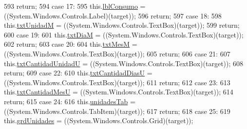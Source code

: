 \begin{DoxyCode}
593             \textcolor{keywordflow}{return};
594             \textcolor{keywordflow}{case} 17:
595             this.\hyperlink{class_proyecto___integrador__3_1_1_reportes_1_1_reporte_frecuencia_de_uso_aad6d42ec1def08d2c9851f5952be9428}{lblConsumo} = ((System.Windows.Controls.Label)(target));
596             \textcolor{keywordflow}{return};
597             \textcolor{keywordflow}{case} 18:
598             this.\hyperlink{class_proyecto___integrador__3_1_1_reportes_1_1_reporte_frecuencia_de_uso_a5f1eb7192932de54000a607fd13e1c00}{txtUnidadM} = ((System.Windows.Controls.TextBox)(target));
599             \textcolor{keywordflow}{return};
600             \textcolor{keywordflow}{case} 19:
601             this.\hyperlink{class_proyecto___integrador__3_1_1_reportes_1_1_reporte_frecuencia_de_uso_af8bd143e56528392c10ffa7c3cd6d107}{txtDiaM} = ((System.Windows.Controls.TextBox)(target));
602             \textcolor{keywordflow}{return};
603             \textcolor{keywordflow}{case} 20:
604             this.\hyperlink{class_proyecto___integrador__3_1_1_reportes_1_1_reporte_frecuencia_de_uso_a09866a06c2de29cae45eec70baaa743c}{txtMesM} = ((System.Windows.Controls.TextBox)(target));
605             \textcolor{keywordflow}{return};
606             \textcolor{keywordflow}{case} 21:
607             this.\hyperlink{class_proyecto___integrador__3_1_1_reportes_1_1_reporte_frecuencia_de_uso_ad46d30c5b21fe0ba956859aeb8af08b3}{txtCantidadUnidadU} = ((System.Windows.Controls.TextBox)(target));
608             \textcolor{keywordflow}{return};
609             \textcolor{keywordflow}{case} 22:
610             this.\hyperlink{class_proyecto___integrador__3_1_1_reportes_1_1_reporte_frecuencia_de_uso_a939dae08740f0d01990fe4ceea680731}{txtCantidadDiasU} = ((System.Windows.Controls.TextBox)(target));
611             \textcolor{keywordflow}{return};
612             \textcolor{keywordflow}{case} 23:
613             this.\hyperlink{class_proyecto___integrador__3_1_1_reportes_1_1_reporte_frecuencia_de_uso_a8132ea90b7430a179c01f1c6e3216d0c}{txtCantidadMesU} = ((System.Windows.Controls.TextBox)(target));
614             \textcolor{keywordflow}{return};
615             \textcolor{keywordflow}{case} 24:
616             this.\hyperlink{class_proyecto___integrador__3_1_1_reportes_1_1_reporte_frecuencia_de_uso_a583dbbaea246bdc1979eb787c835d116}{unidadesTab} = ((System.Windows.Controls.TabItem)(target));
617             \textcolor{keywordflow}{return};
618             \textcolor{keywordflow}{case} 25:
619             this.\hyperlink{class_proyecto___integrador__3_1_1_reportes_1_1_reporte_frecuencia_de_uso_a0054ea7e45426e7bc4779c6d4e3144b8}{grdUnidades} = ((System.Windows.Controls.Grid)(target));

\end{DoxyCode}
